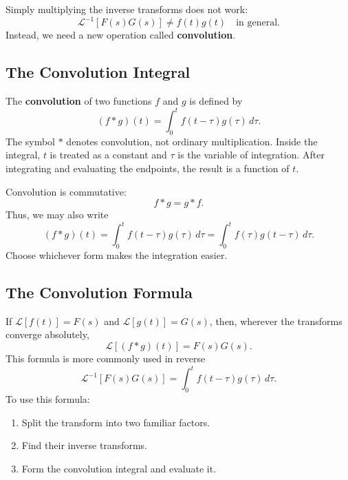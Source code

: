 \documentclass[10pt,letterpaper]{article}
\begin{document}
Simply multiplying the inverse transforms does not work:
\[
\mathcal L^{-1}[F(s)G(s)]\ne f(t)g(t)
\quad\text{in general}.
\]
Instead, we need a new operation called
\textbf{convolution}.

\subsection{The Convolution Integral}

The \textbf{convolution} of two functions $f$ and $g$
is defined by
\[
\boxed{
(f*g)(t)=\int_0^t f(t-\tau)g(\tau)\,d\tau.
}
\]
The symbol $*$ denotes convolution, not ordinary
multiplication. Inside the integral, $t$ is treated as a constant
and $\tau$ is the variable of integration.
After integrating and evaluating the endpoints,
the result is a function of $t$.

Convolution is commutative:
\[
f*g=g*f.
\]
Thus, we may also write
\[
(f*g)(t)=\int_0^t f(t-\tau)g(\tau)\,d\tau=\int_0^t f(\tau)g(t-\tau)\,d\tau.
\]
Choose whichever form makes the integration easier.

\subsection{The Convolution Formula}

If $\mathcal L[f(t)]=F(s)$ and
$\mathcal L[g(t)]=G(s)$, then, wherever the transforms
converge absolutely,
\[
\boxed{\mathcal L[(f*g)(t)]=F(s)G(s).}
\]
This formula is more commonly used in reverse 
\[
\boxed{
\mathcal L^{-1}[F(s)G(s)]
=\int_0^t f(t-\tau)g(\tau)\,d\tau.
}
\]
To use this formula:
\begin{enumerate}
    \item Split the transform into two familiar factors.
    \item Find their inverse transforms.
    \item Form the convolution integral and evaluate it.
\end{enumerate}
\end{document}
